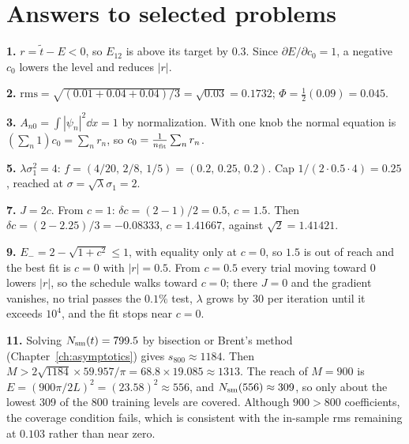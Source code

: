 \begin{problemlist}

\end{problemlist}

\section{Answers to selected problems}

\textbf{1.} $r=\tilde t-E<0$, so $E_{12}$ is above its target by $0.3$. Since $\partial E/\partial c_0=1$, a negative $c_0$ lowers the level and reduces $|r|$.

\textbf{2.} $\mathrm{rms}=\sqrt{(0.01+0.04+0.04)/3}=\sqrt{0.03}=0.1732$; $\Phi=\tfrac12(0.09)=0.045$.

\textbf{3.} $A_{n0}=\int|\psi_n|^2\dd x=1$ by normalization. With one knob the normal equation is $(\sum_n1)c_0=\sum_nr_n$, so $c_0=\frac{1}{n_{\rm fit}}\sum_nr_n$.

\textbf{5.} $\lambda\sigma_1^2=4$: $f=(4/20,\,2/8,\,1/5)=(0.2,\,0.25,\,0.2)$. Cap $1/(2\cdot0.5\cdot4)=0.25$, reached at $\sigma=\sqrt\lambda\sigma_1=2$.

\textbf{7.} $J=2c$. From $c=1$: $\delta c=(2-1)/2=0.5$, $c=1.5$. Then $\delta c=(2-2.25)/3=-0.08333$, $c=1.41667$, against $\sqrt2=1.41421$.

\textbf{9.} $E_-=2-\sqrt{1+c^2}\le1$, with equality only at $c=0$, so $1.5$ is out of reach and the best fit is $c=0$ with $|r|=0.5$. From $c=0.5$ every trial moving toward 0 lowers $|r|$, so the schedule walks toward $c=0$; there $J=0$ and the gradient vanishes, no trial passes the $0.1\%$ test, $\lambda$ grows by 30 per iteration until it exceeds $10^4$, and the fit stops near $c=0$.

\textbf{11.} Solving $N_{\mathrm{sm}}(t)=799.5$ by bisection or Brent's method (Chapter~\ref{ch:asymptotics}) gives $s_{800}\approx1184$. Then $M>2\sqrt{1184}\times59.957/\pi=68.8\times19.085\approx1313$. The reach of $M=900$ is $E=(900\pi/2L)^2=(23.58)^2\approx556$, and $N_{\mathrm{sm}}(556)\approx309$, so only about the lowest 309 of the 800 training levels are covered. Although $900>800$ coefficients, the coverage condition fails, which is consistent with the in-sample rms remaining at $0.103$ rather than near zero.

